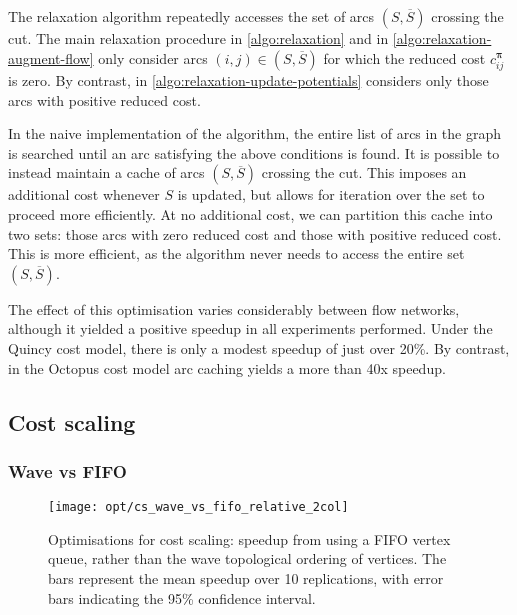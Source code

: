 The relaxation algorithm repeatedly accesses the set of arcs $\left(S,\overline{S}\right)$ crossing the cut. The main relaxation procedure in \cref{algo:relaxation} and  in \cref{algo:relaxation-augment-flow} only consider arcs $(i,j) \in \left(S,\overline{S}\right)$ for which the reduced cost $c_{ij}^{\boldsymbol{\pi}}$ is zero. By contrast,  in \cref{algo:relaxation-update-potentials} considers only those arcs with positive reduced cost.

In the naive implementation of the algorithm, the entire list of arcs in the graph is searched until an arc satisfying the above conditions is found. It is possible to instead maintain a cache of arcs $\left(S,\overline{S}\right)$ crossing the cut. This imposes an additional cost whenever $S$ is updated, but allows for iteration over the set to proceed more efficiently. At no additional cost, we can partition this cache into two sets: those arcs with zero reduced cost and those with positive reduced cost\footnotemark. This is more efficient, as the algorithm never needs to access the entire set $\left(S,\overline{S}\right)$.

The effect of this optimisation varies considerably between flow networks, although it yielded a positive speedup in all experiments performed. Under the Quincy cost model, there is only a modest speedup of just over 20\%. By contrast, in the Octopus cost model arc caching yields a more than 40x speedup\footnotemark.

\subsection{Cost scaling}

\subsubsection{Wave vs FIFO}

\begin{figure}
    \centering
    \texttt{[image: opt/cs\_wave\_vs\_fifo\_relative\_2col]}
    \caption[Optimisations for cost scaling]{Optimisations for cost scaling: speedup from using a FIFO vertex queue, rather than the wave topological ordering of vertices. The bars represent the mean speedup over 10 replications, with error bars indicating the 95\% confidence interval.}
    \label{fig:opt-cs-wave-vs-fifo}
\end{figure}

